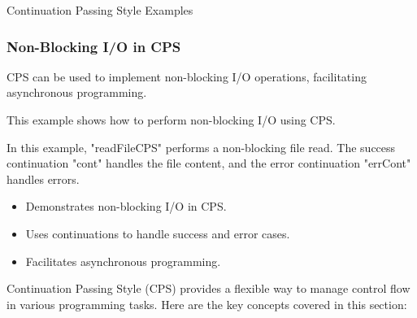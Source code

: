 \begin{notes}{Continuation Passing Style Examples}
\begin{highlight}
    \end{highlight}
    
    \subsubsection*{Non-Blocking I/O in CPS}
    
    CPS can be used to implement non-blocking I/O operations, facilitating asynchronous programming.
    
    \begin{highlight}
    
        This example shows how to perform non-blocking I/O using CPS.
    
    
        In this example, "readFileCPS" performs a non-blocking file read. The success continuation "cont" handles the file content, and the error continuation "errCont" handles errors.
    
        \begin{itemize}
            \item Demonstrates non-blocking I/O in CPS.
            \item Uses continuations to handle success and error cases.
            \item Facilitates asynchronous programming.
        \end{itemize}
    
    \end{highlight}
    
    \begin{highlight}
    
        Continuation Passing Style (CPS) provides a flexible way to manage control flow in various programming tasks. Here are the key concepts covered in this section:
    

\end{highlight}
\end{notes}

